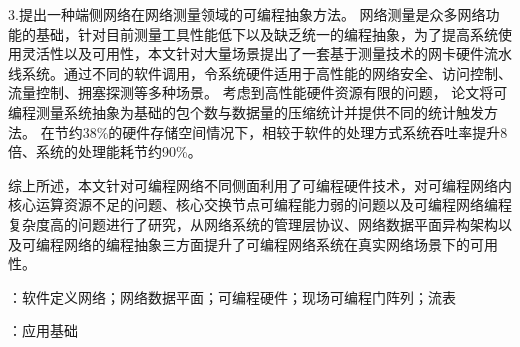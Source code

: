 3.提出一种端侧网络在网络测量领域的可编程抽象方法。
网络测量是众多网络功能的基础，针对目前测量工具性能低下以及缺乏统一的编程抽象，为了提高系统使用灵活性以及可用性，本文针对大量场景提出了一套基于测量技术的网卡硬件流水线系统。通过不同的软件调用，令系统硬件适用于高性能的网络安全、访问控制、流量控制、拥塞探测等多种场景。
考虑到高性能硬件资源有限的问题，
论文将可编程测量系统抽象为基础的包个数与数据量的压缩统计并提供不同的统计触发方法。
在节约38\%的硬件存储空间情况下，相较于软件的处理方式系统吞吐率提升8倍、系统的处理能耗节约90\%。

综上所述，本文针对可编程网络不同侧面利用了可编程硬件技术，对可编程网络内核心运算资源不足的问题、核心交换节点可编程能力弱的问题以及可编程网络编程复杂度高的问题进行了研究，从网络系统的管理层协议、网络数据平面异构架构以及可编程网络的编程抽象三方面提升了可编程网络系统在真实网络场景下的可用性。



{\boldsong}
\vspace{\baselineskip}
：软件定义网络；网络数据平面；可编程硬件；现场可编程门阵列；流表

\vspace{\baselineskip}
：应用基础


\clearpage


